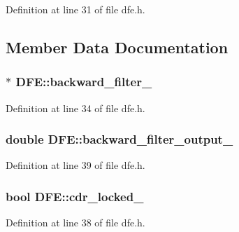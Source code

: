 Definition at line 31 of file dfe.\+h.



\subsection{Member Data Documentation}
\hypertarget{class_d_f_e_aa6953c7cf764551e2f4b14f7ea1759a9}{}
\subsubsection[{backward\+\_\+filter\+\_\+}]{$\ast$ D\+F\+E\+::backward\+\_\+filter\+\_\+\hspace{0.3cm}{\ttfamily [protected]}}\label{class_d_f_e_aa6953c7cf764551e2f4b14f7ea1759a9}


Definition at line 34 of file dfe.\+h.

\hypertarget{class_d_f_e_a76d12aa6b5972a1d7aade0202c855699}{}
\subsubsection[{backward\+\_\+filter\+\_\+output\+\_\+}]{\setlength{\rightskip}{0pt plus 5cm}double D\+F\+E\+::backward\+\_\+filter\+\_\+output\+\_\+\hspace{0.3cm}{\ttfamily [protected]}}\label{class_d_f_e_a76d12aa6b5972a1d7aade0202c855699}


Definition at line 39 of file dfe.\+h.

\hypertarget{class_d_f_e_aa50b830d84b9003160731dc0a0caa5c2}{}
\subsubsection[{cdr\+\_\+locked\+\_\+}]{\setlength{\rightskip}{0pt plus 5cm}bool D\+F\+E\+::cdr\+\_\+locked\+\_\+\hspace{0.3cm}{\ttfamily [protected]}}\label{class_d_f_e_aa50b830d84b9003160731dc0a0caa5c2}


Definition at line 38 of file dfe.\+h.


